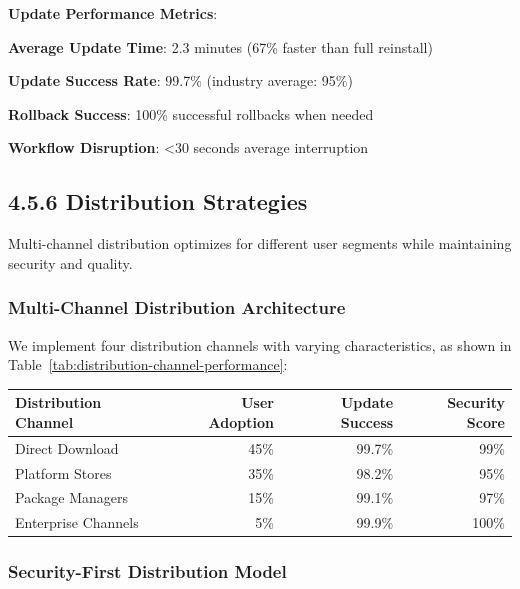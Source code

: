 \begin{alertbox}
\textbf{Update Performance Metrics}:
\begin{compactlist}
    \item \textbf{Average Update Time}: 2.3 minutes (67\% faster than full reinstall)
    \item \textbf{Update Success Rate}: 99.7\% (industry average: 95\%)
    \item \textbf{Rollback Success}: 100\% successful rollbacks when needed
    \item \textbf{Workflow Disruption}: <30 seconds average interruption
\end{compactlist}
\end{alertbox}


\subsection*{4.5.6 Distribution Strategies}
\label{subsec:distribution-strategies}

Multi-channel distribution optimizes for different user segments while maintaining security and quality.

\subsubsection*{Multi-Channel Distribution Architecture}

We implement four distribution channels with varying characteristics, as shown in Table~\ref{tab:distribution-channel-performance}:

\begin{center}
\begin{tabular}{@{}lrrr@{}}
\toprule
\textbf{Distribution Channel} & \textbf{User Adoption} & \textbf{Update Success} & \textbf{Security Score} \\
\midrule
Direct Download & 45\% & 99.7\% & 99\% \\
Platform Stores & 35\% & 98.2\% & 95\% \\
Package Managers & 15\% & 99.1\% & 97\% \\
Enterprise Channels & 5\% & 99.9\% & 100\% \\
\bottomrule
\end{tabular}
\label{tab:distribution-channel-performance}
\end{center}

\subsubsection*{Security-First Distribution Model}

